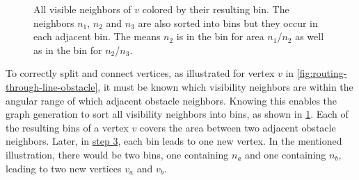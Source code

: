 			\begin{figure}[h]
				\begin{figcenter}
				\end{figcenter}
				\caption{All visible neighbors of $v$ colored by their resulting bin. The neighbors $n_1$, $n_2$ and $n_3$ are also sorted into bins but they occur in each adjacent bin. The means $n_2$ is in the bin for area $n_1$/$n_2$ as well as in the bin for $n_2$/$n_3$.}
				\label{fig:visibility-bin-sorting}
			\end{figure}
			
			To correctly split and connect vertices, as illustrated for vertex $v$ in \cref{fig:routing-through-line-obstacle}, it must be known which visibility neighbors are within the angular range of which adjacent obstacle neighbors.
			Knowing this enables the graph generation to sort all visibility neighbors into bins, as shown in \cref{fig:visibility-bin-sorting}.
			Each of the resulting bins of a vertex $v$ covers the area between two adjacent obstacle neighbors.
			Later, in \hyperref[subsec:step-3-graph-creation]{step 3}, each bin leads to one new vertex.
			In the mentioned illustration, there would be two bins, one containing $n_a$ and one containing $n_b$, leading to two new vertices $v_a$ and $v_b$.
			
